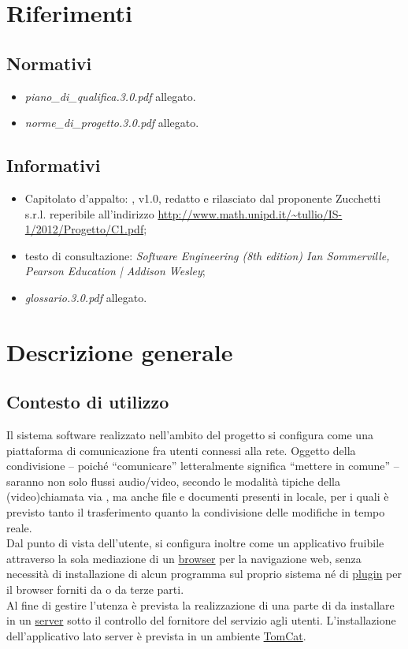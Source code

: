 \section{Riferimenti}

\subsection{Normativi}
\begin{itemize}
\item[] \textit{piano\_di\_qualifica.3.0.pdf} allegato.
\item[] \textit{norme\_di\_progetto.3.0.pdf} allegato.
\end{itemize}

\subsection{Informativi}
\begin{itemize}
\item[] Capitolato d'appalto: \caName{}, v1.0, redatto e rilasciato dal proponente Zucchetti s.r.l. reperibile all'indirizzo \url{http://www.math.unipd.it/~tullio/IS-1/2012/Progetto/C1.pdf};
\item[] testo di consultazione: \textit{Software Engineering (8th edition) Ian Sommerville, Pearson Education | Addison Wesley};
\item[] \textit{glossario.3.0.pdf} allegato.
\end{itemize}

\clearpage
\section{Descrizione generale}

\subsection{Contesto di utilizzo}
Il sistema software realizzato nell'ambito del progetto \caName{} si configura come una piattaforma di comunicazione fra utenti connessi alla rete. Oggetto della condivisione -- poiché ``comunicare'' letteralmente significa ``mettere in comune'' -- saranno non solo flussi audio/video, secondo le modalità tipiche della (video)chiamata via , ma anche file e documenti presenti in locale, per i quali è previsto tanto il trasferimento quanto la condivisione delle modifiche in tempo reale.\\
Dal punto di vista dell'utente, \caName{} si configura inoltre come un applicativo fruibile attraverso la sola mediazione di un \underline{browser} per la navigazione web, senza necessità di installazione di alcun programma  sul proprio sistema né di \underline{plugin} per il browser forniti da \team{} o da terze parti.\\
Al fine di gestire l'utenza è prevista la realizzazione di una parte di  da installare in un \underline{server} sotto il controllo del fornitore del servizio agli utenti. L'installazione dell'applicativo lato {server} è prevista in un ambiente \underline{TomCat}.

